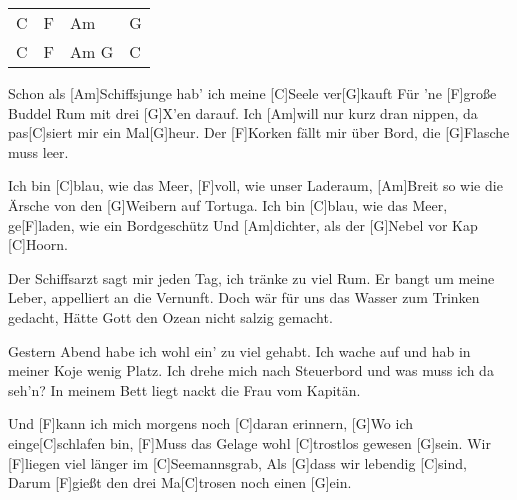 

\begin{guitar}
	{\footnotesize\begin{tabular}{l|l|l|l}
			C & F & Am & G \\
			C & F & Am G & C 
	\end{tabular}}
	
	
	Schon als [Am]Schiffsjunge hab' ich meine [C]Seele ver[G]kauft
	Für 'ne [F]große Buddel Rum mit drei [G]X'en darauf.
	Ich [Am]will nur kurz dran nippen, da pas[C]siert mir ein Mal[G]heur.
	Der [F]Korken fällt mir über Bord, die [G]Flasche muss leer.
	
	Ich bin [C]blau, wie das Meer, [F]voll, wie unser Laderaum,
	[Am]Breit so wie die Ärsche von den [G]Weibern auf Tortuga.
	Ich bin [C]blau, wie das Meer, ge[F]laden, wie ein Bordgeschütz
	Und [Am]dichter, als der [G]Nebel vor Kap [C]Hoorn.
	
	Der Schiffsarzt sagt mir jeden Tag, ich tränke zu viel Rum.
	Er bangt um meine Leber, appelliert an die Vernunft.
	Doch wär für uns das Wasser zum Trinken gedacht,
	Hätte Gott den Ozean nicht salzig gemacht.
	
	 
	
	Gestern Abend habe ich wohl ein' zu viel gehabt.
	Ich wache auf und hab in meiner Koje wenig Platz.
	Ich drehe mich nach Steuerbord und was muss ich da seh'n?
	In meinem Bett liegt nackt die Frau vom Kapitän.
	
	 
	
	\pagebreak
	
	Und [F]kann ich mich morgens noch [C]daran erinnern,
	[G]Wo ich einge[C]schlafen bin,
	[F]Muss das Gelage wohl [C]trostlos gewesen [G]sein.
	Wir [F]liegen viel länger im [C]Seemannsgrab,
	Als [G]dass wir lebendig [C]sind,
	Darum [F]gießt den drei Ma[C]trosen noch einen [G]ein.
	
	 
	
	 
	
\end{guitar}